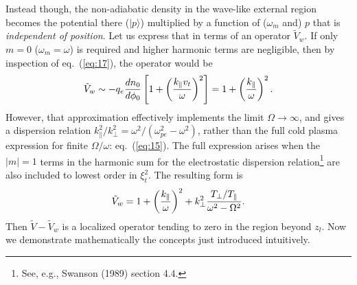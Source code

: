 \documentclass[12pt]{article}
\def\ket#1{|#1\rangle}
\begin{document}
Instead though, the non-adiabatic density in the wave-like external region
becomes the potential there ($\ket{p}$) multiplied by a function of
($\omega_m$ and) $p$ that is \emph{independent of position}. Let us
express that in terms of an operator $\tilde{V}_{w}$. If only $m=0$
($\omega_m=\omega$) is
required and higher harmonic terms are negligible, then by inspection
of eq.\ (\ref{eq:17}), the operator
would be 
\begin{equation}
  \label{eq:20}
\tilde{V}_{w}\sim-q_e{dn_0\over d\phi_0}\left[1+\left(k_\parallel v_t\over\omega\right)^2\right]=1+\left(k_\parallel\over\omega\right)^2.
\end{equation}
However, that approximation effectively implements the limit
$\Omega\to \infty$, and gives a dispersion relation
$k_\parallel^2/k_\perp^2 = \omega^2/(\omega_{pe}^2-\omega^2)$, rather
than the full cold plasma expression for finite $\Omega/\omega$: eq.\
(\ref{eq:15}). The full expression arises when the $|m|=1$ terms in
the harmonic sum for the electrostatic dispersion
relation\footnote{See, e.g., Swanson (1989) section 4.4.} are also
included to lowest order in $\xi_t^2$. The resulting form is
\begin{equation}
  \label{eq:24}
  \tilde V_w= 1 + \left(k_\parallel\over\omega\right)^2 +
  k_\perp^2 {T_\perp/T_\parallel\over\omega^2-\Omega^2}.
\end{equation}
Then
$\tilde{V}-\tilde{V}_{w}$ is a localized operator tending to zero in
the region beyond $z_l$. Now we demonstrate mathematically the
concepts just introduced intuitively.
\end{document}
